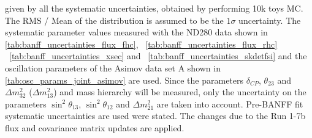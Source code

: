 \begin{table}[htb]
{ given by all the systematic uncertainties, obtained by performing 10k toys MC.
The RMS / Mean of the distribution is assumed to be the $1\sigma$ uncertainty.
The systematic parameter values measured with the ND280 data 
shown in 
\cref{tab:banff_uncertainties_flux_fhc},
~\ref{tab:banff_uncertainties_flux_rhc}
~\ref{tab:banff_uncertainties_xsec}
and
~\ref{tab:banff_uncertainties_skdetfsi}
and the oscillation parameters of the Asimov data set A shown in \cref{tab:osc_params_joint_asimov}
are used.
Since the parameters $\delta_{CP}$, $\theta_{23}$ and $\Delta m^2_{32}$ ($\Delta m^2_{13}$) and mass hierarchy
will be measured,
only the uncertainty on the parameters 
$\sin^2 \theta_{13}$,
$\sin^2 \theta_{12}$
and 
$\Delta m^2_{21}$ 
are taken into account.
Pre-BANFF fit systematic uncertainties are used were stated.
The changes due to the Run 1-7b flux and covariance matrix updates are applied.
}                                                                                                                                                                                          
\label{tab:nsk_systematic_table_summary_joint_asimov_A_rhc_elike_Run17b}
\end{table}


















